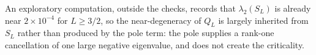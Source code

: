 An exploratory computation, outside the checks, records that $\lambda_2(S_L)$ is
already near $2\times10^{-4}$ for $L\geq3/2$, so the near-degeneracy of $Q_L$ is
largely inherited from $S_L$ rather than produced by the pole term: the pole
supplies a rank-one cancellation of one large negative eigenvalue, and does not
create the criticality.
